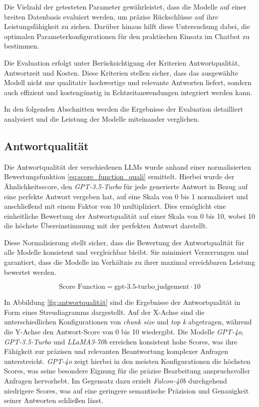 Die Vielzahl der getesteten Parameter gewährleistet, dass die Modelle auf einer breiten Datenbasis evaluiert werden, um präzise Rückschlüsse auf ihre Leistungsfähigkeit zu ziehen. 
Darüber hinaus hilft diese Untersuchung dabei, die optimalen Parameterkonfigurationen für den praktischen Einsatz im Chatbot zu bestimmen.

Die Evaluation erfolgt unter Berücksichtigung der Kriterien Antwortqualität, Antwortzeit und Kosten. Diese Kriterien stellen sicher, dass das ausgewählte Modell nicht nur qualitativ hochwertige und relevante Antworten liefert, 
sondern auch effizient und kostengünstig in Echtzeitanwendungen integriert werden kann.

In den folgenden Abschnitten werden die Ergebnisse der Evaluation detailliert analysiert und die Leistung der Modelle miteinander verglichen.

\subsection{Antwortqualität}

Die Antwortqualität der verschiedenen \acp{LLM} wurde anhand einer normalisierten Bewertungsfunktion \ref{eq:score_function_quali} ermittelt. 
Hierbei wurde der Ähnlichkeitsscore, den \textit{GPT-3.5-Turbo} für jede generierte Antwort in Bezug auf eine perfekte Antwort vergeben hat, 
auf eine Skala von 0 bis 1 normalisiert und anschließend mit einem Faktor von 10 multipliziert. 
Dies ermöglicht eine einheitliche Bewertung der Antwortqualität auf einer Skala von 0 bis 10, wobei 10 die höchste Übereinstimmung mit der perfekten Antwort darstellt.

Diese Normalisierung stellt sicher, dass die Bewertung der Antwortqualität für alle Modelle konsistent und vergleichbar bleibt. 
Sie minimiert Verzerrungen und garantiert, dass die Modelle im Verhältnis zu ihrer maximal erreichbaren Leistung bewertet werden.

\begin{equation}
    \mbox{Score Function} = \mbox{gpt-3.5-turbo\_judgement} \cdot 10
    \label{eq:score_function_quali}
\end{equation}

In Abbildung \ref{fig:antwortqualität} sind die Ergebnisse der Antwortqualität in Form eines Streudiagramms dargestellt. 
Auf der X-Achse sind die unterschiedlichen Konfigurationen von \textit{chunk size} und \textit{top k} abgetragen, während die Y-Achse den Antwort-Score von 0 bis 10 wiedergibt.
Die Modelle \textit{GPT-4o}, \textit{GPT-3.5-Turbo} und \textit{LLaMA3-70b} erreichen konsistent hohe Scores, was ihre Fähigkeit zur präzisen und relevanten Beantwortung komplexer Anfragen unterstreicht.
\textit{GPT-4o} zeigt hierbei in den meisten Konfigurationen die höchsten Scores, was seine besondere Eignung für die präzise Bearbeitung anspruchsvoller Anfragen hervorhebt.
Im Gegensatz dazu erzielt \textit{Falcon-40b} durchgehend niedrigere Scores, was auf eine geringere semantische Präzision und Genauigkeit seiner Antworten schließen lässt.

